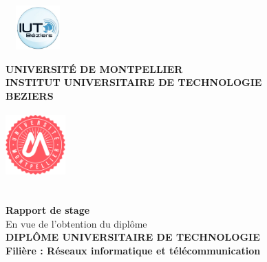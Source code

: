 \documentclass[a4paper,12pt]{report}
\begin{document}
\begin{titlepage}

\begin{center}
	\begin{minipage}{2.5cm}
	\begin{center}
		\includegraphics[width=2.5cm,height=1.7cm]{image/iut.jpg}
		
	\end{center}
\end{minipage}\hfill
\begin{minipage}{10cm}
	\begin{center}
	\textbf{ UNIVERSITÉ DE MONTPELLIER}\\[0.1cm]
    \textbf{INSTITUT UNIVERSITAIRE DE TECHNOLOGIE}\\[0.1cm]
    \textbf{BEZIERS}
	\end{center}
\end{minipage}\hfill
\begin{minipage}{2.5cm}
	\begin{center}
		\includegraphics[width=2.3cm,height=2.5cm]{image/um}
	\end{center}

\end{minipage}
\textsc{\Large }\\[1.5cm]
{\large \bfseries Rapport de stage}\\[0.5cm]
{\large En vue de l'obtention du diplôme}\\[1cm]

{\huge \bfseries \uppercase{Diplôme universitaire de technologie} \\[0.5cm] }
{\large \bfseries Filière : Réseaux informatique et télécommunication}
\textsc{\Large }\\[1cm]


\end{center}
\end{titlepage}
\end{document}
